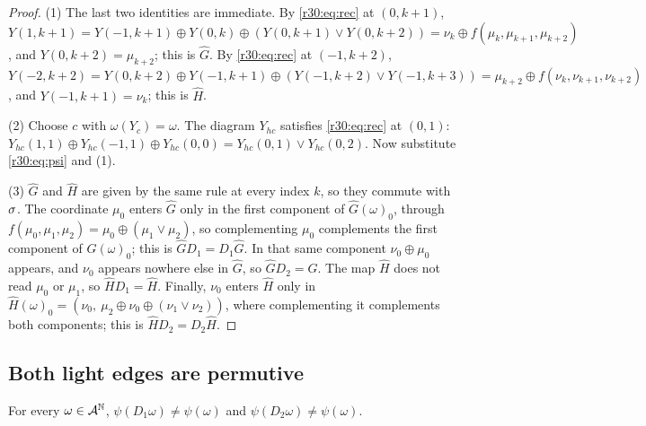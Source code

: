 \begin{proof}
(1) The last two identities are immediate. By \eqref{r30:eq:rec} at $(0,k+1)$, $Y(1,k+1)=Y(-1,k+1)\oplus Y(0,k)\oplus(Y(0,k+1)\vee Y(0,k+2))=\nu_k\oplus f(\mu_k,\mu_{k+1},\mu_{k+2})$, and $Y(0,k+2)=\mu_{k+2}$; this is $\hat G$. By \eqref{r30:eq:rec} at $(-1,k+2)$, $Y(-2,k+2)=Y(0,k+2)\oplus Y(-1,k+1)\oplus(Y(-1,k+2)\vee Y(-1,k+3))=\mu_{k+2}\oplus f(\nu_k,\nu_{k+1},\nu_{k+2})$, and $Y(-1,k+1)=\nu_k$; this is $\hat H$.

(2) Choose $c$ with $\omega(Y_c)=\omega$. The diagram $Y_{hc}$ satisfies \eqref{r30:eq:rec} at $(0,1)$:
$Y_{hc}(1,1)\oplus Y_{hc}(-1,1)\oplus Y_{hc}(0,0)=Y_{hc}(0,1)\vee Y_{hc}(0,2)$. Now substitute \eqref{r30:eq:psi} and (1).

(3) $\hat G$ and $\hat H$ are given by the same rule at every index $k$, so they commute with $\sigma$. The coordinate $\mu_0$ enters $\hat G$ only in the first component of $\hat G(\omega)_0$, through $f(\mu_0,\mu_1,\mu_2)=\mu_0\oplus(\mu_1\vee\mu_2)$, so complementing $\mu_0$ complements the first component of $\hat G(\omega)_0$; this is $\hat GD_1=D_1\hat G$. In that same component $\nu_0\oplus\mu_0$ appears, and $\nu_0$ appears nowhere else in $\hat G$, so $\hat GD_2=\hat G$. The map $\hat H$ does not read $\mu_0$ or $\mu_1$, so $\hat HD_1=\hat H$. Finally, $\nu_0$ enters $\hat H$ only in $\hat H(\omega)_0=(\nu_0,\ \mu_2\oplus\nu_0\oplus(\nu_1\vee\nu_2))$, where complementing it complements both components; this is $\hat HD_2=D_2\hat H$.
\end{proof}

\subsection{Both light edges are permutive}\label{r30:sec:edges}

\begin{proposition}\label{r30:prop:edges}
For every $\omega\in\mathcal{A}^{\mathbb{N}}$, $\psi(D_1\omega)\ne\psi(\omega)$ and $\psi(D_2\omega)\ne\psi(\omega)$.
\end{proposition}

